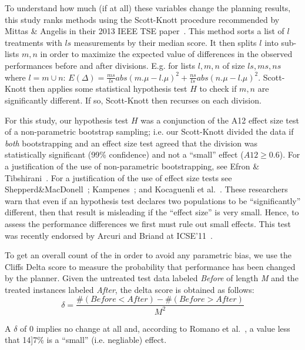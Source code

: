 \documentclass[conference]{IEEEtran}
\begin{document}
To understand how much (if at all) these variables change the planning results, 
this study ranks methods using the Scott-Knott
procedure recommended by Mittas \& Angelis in their 2013
IEEE TSE paper~\cite{mittas13}.  This method
sorts a list of $l$ treatments with $ls$ measurements by their median
score. It then
splits $l$ into sub-lists $m,n$ in order to maximize the expected value of
 differences  in the observed performances
before and after divisions. E.g. for lists $l,m,n$ of size $ls,ms,ns$ where $l=m\cup n$:
 $E(\Delta)=\frac{ms}{ls}abs(m.\mu - l.\mu)^2 + \frac{ns}{ls}abs(n.\mu - l.\mu)^2$.
Scott-Knott then applies some statistical hypothesis test $H$ to check
if $m,n$ are significantly different. If so, Scott-Knott then recurses on each division.
 
For this study, our hypothesis test $H$ was a
conjunction of the A12 effect size test of  a
non-parametric bootstrap sampling; i.e. our
Scott-Knott divided the data if {\em both}
bootstrapping and an effect size test agreed that
the division was statistically significant (99\%
confidence) and not a ``small'' effect ($A12 \ge
0.6$).
For a justification of the use of non-parametric
bootstrapping, see Efron \&
Tibshirani~\cite[p220-223]{efron93}.
For a justification of the use of effect size tests
see Shepperd\&MacDonell~\cite{shepperd12a}; Kampenes~\cite{kampenes07}; and
Kocaguenli et al.~\cite{kocharm13}. These researchers
warn that even if an
hypothesis test declares two populations to be
``significantly'' different, then that result is
misleading if the ``effect size'' is very small.
Hence, to assess 
the performance differences 
we first must rule out small effects.
This test was recently 
endorsed by Arcuri and Briand
at ICSE'11~\cite{arcuri11}.

 
  



To get an overall count of the   in  order to avoid any parametric bias,
we use the Cliffs Delta score to measure the probability that performance has been changed
by the planner.   Given the untreated test data labeled \textit{Before} of length \textit{M} and the treated instances labeled \textit{After}, the delta score is obtained as follows:
\begin{equation}
\delta = \frac{\#(Before<After) - \#(Before>After)}{M^2}
\label{eq:cliffs}
\end{equation}

A $\delta$ of  0 implies no change at all and, according to Romano et al.~\cite{romano06}, a value less
that 14]7\% is a ``small'' (i.e. negliable) effect.
\end{document}
